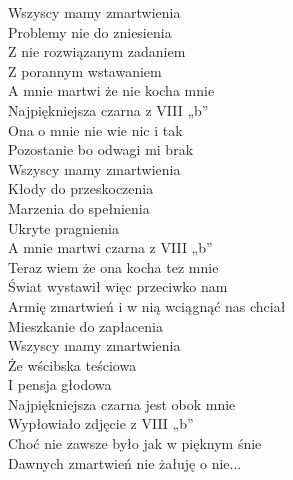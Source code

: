 \begin{text}
Wszyscy mamy zmartwienia\\
Problemy nie do zniesienia\\
Z nie rozwiązanym zadaniem\\
Z porannym wstawaniem\\

A mnie martwi że nie kocha mnie\\
Najpiękniejsza czarna z VIII „b”\\
Ona o mnie nie wie nic i tak\\
Pozostanie bo odwagi mi brak\\

Wszyscy mamy zmartwienia\\
Kłody do przeskoczenia\\
Marzenia do spełnienia\\
Ukryte pragnienia\\

A mnie martwi czarna z VIII „b”\\
Teraz wiem że ona kocha tez mnie\\
Świat wystawił więc przeciwko nam\\
Armię zmartwień i w nią wciągnąć nas chciał\\

Mieszkanie do zapłacenia\\
Wszyscy mamy zmartwienia\\
Że wścibska teściowa\\
I pensja głodowa\\

Najpiękniejsza czarna jest obok mnie\\
Wypłowiało zdjęcie z VIII „b”\\
Choć nie zawsze było jak w pięknym śnie\\
Dawnych zmartwień nie żałuję o nie...\\
\end{text}
